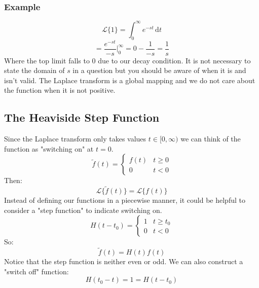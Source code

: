 \documentclass[12pt]{article}
\newcommand{\lapl}[1]{\mathcal{L}\{#1\}}
\begin{document}
\subsubsection{Example}
\[\lapl{1}=\int^\infty_0e^{-st}\,\text{d}t\]
\[=\frac{e^{-st}}{-s}\bigl|_{0}^\infty=0-\frac{1}{-s}=\frac{1}{s}\]
Where the top limit falls to \(0\) due to our decay condition. It is not necessary to state the domain of \(s\) in a question but you should be aware of when it is and isn't valid. The Laplace transform is a global mapping and we do not care about the function when it is not positive.
\subsection{The Heaviside Step Function}
Since the Laplace transform only takes values \(t\in[0,\infty)\) we can think of the function as "switching on" at \(t=0\).
\[\tilde{f}(t)=\begin{cases}
    f(t)&t\geq 0 \\
    0 & t<0
\end{cases}\]
Then:
\[\lapl{\tilde{f}(t)}=\lapl{f(t)}\]
Instead of defining our functions in a piecewise manner, it could be helpful to consider a "step function" to indicate switching on.
\[H(t-t_0)=\begin{cases}
    1 & t\geq t_0 \\
    0 & t<0
\end{cases}\]
So:
\[\tilde{f}(t)=H(t)f(t)\]
Notice that the step function is neither even or odd. We can also construct a "switch off" function:
\[H(t_0-t)=1=H(t-t_0)\]
\end{document}
